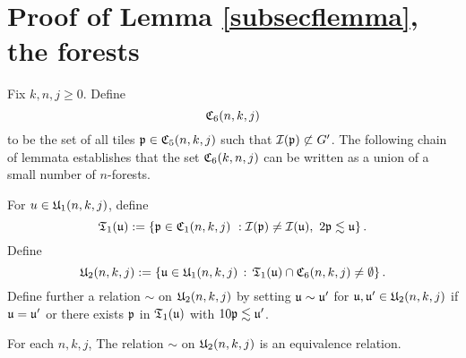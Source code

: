 \section{Proof of Lemma \ref{subsecflemma}, the forests}
\label{subsecforest}

Fix $k,n,j\ge 0$.
Define
$$
    \mathfrak C_6(n,k,j)
$$
to be the set of all tiles $\mathfrak p \in \mathfrak C_5(n,k,j)$ such that $\mathcal{I}(\mathfrak p) \not\subset G'$. The following chain of lemmata
establishes that the set $\mathfrak C_6(k,n,j)$ can be written as a union of a small number of $n$-forests.

For $u\in \mathfrak U_1(n,k,j)$, define
\begin{equation}
    \label{eq T1 def}
    \mathfrak{T}_1(\mathfrak u):= \{\mathfrak p \in \mathfrak C_1(n,k,j) \ : \mathcal{I}(\mathfrak p)\neq \mathcal{I}(\mathfrak u), \ 2\mathfrak p \lesssim  \mathfrak u\}\,.
\end{equation}
Define
\begin{equation}
    \label{eq U2 def}
    \mathfrak U_2(n,k,j) := \{ \mathfrak u \in \mathfrak U_1(n,k,j) \, : \, \mathfrak{T}_1(\mathfrak u)  \cap \mathfrak C_6(n,k,j) \ne \emptyset\}\,.
\end{equation}
Define further a relation $\sim$ on $\mathfrak U_2(n,k,j)$
by setting $\mathfrak u\sim \mathfrak u'$
for $\mathfrak u,\mathfrak u'\in \mathfrak U_2(n,k,j)$
if $\mathfrak u=\mathfrak u'$ or there exists $\mathfrak p$ in $\mathfrak{T}_1(\mathfrak u)$
with $10 \mathfrak p\lesssim \mathfrak u'$.

\begin{lemma}
\label{lem equivalence relation}
For each $n,k,j$, The relation $\sim$ on
$\mathfrak U_2(n,k,j)$ is an equivalence relation.
\end{lemma}

